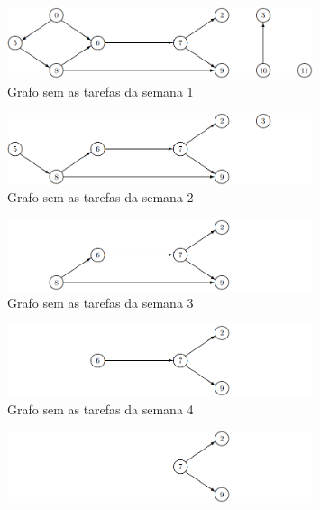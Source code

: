 \documentclass[11pt]{article}
\begin{document}
\begin{center}
    \begin{figure}[h!]
        \includegraphics[width=0.8\textwidth]{imgs/grafo1.png}
        \caption{Grafo sem as tarefas da semana 1}
        \label{fig:grafo1}
    \end{figure}
    \begin{figure}[h!]
        \includegraphics[width=0.8\textwidth]{imgs/grafo2.png}
        \caption{Grafo sem as tarefas da semana 2}
        \label{fig:grafo2}
    \end{figure}
    \begin{figure}[h!]
        \includegraphics[width=0.8\textwidth]{imgs/grafo3.png}
        \caption{Grafo sem as tarefas da semana 3}
        \label{fig:grafo3}
    \end{figure}
    \begin{figure}[h!]
        \includegraphics[width=0.8\textwidth]{imgs/grafo4.png}
        \caption{Grafo sem as tarefas da semana 4}
        \label{fig:grafo4}
    \end{figure}
    \begin{figure}[h!]
        \includegraphics[width=0.8\textwidth]{imgs/grafo5.png}

\end{figure}
\end{center}
\end{document}
